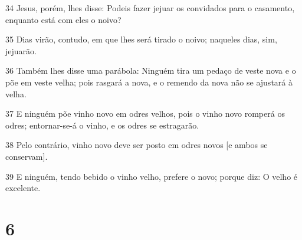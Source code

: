 \par 34 Jesus, porém, lhes disse: Podeis fazer jejuar os convidados para o casamento, enquanto está com eles o noivo?
\par 35 Dias virão, contudo, em que lhes será tirado o noivo; naqueles dias, sim, jejuarão.
\par 36 Também lhes disse uma parábola: Ninguém tira um pedaço de veste nova e o põe em veste velha; pois rasgará a nova, e o remendo da nova não se ajustará à velha.
\par 37 E ninguém põe vinho novo em odres velhos, pois o vinho novo romperá os odres; entornar-se-á o vinho, e os odres se estragarão.
\par 38 Pelo contrário, vinho novo deve ser posto em odres novos [e ambos se conservam].
\par 39 E ninguém, tendo bebido o vinho velho, prefere o novo; porque diz: O velho é excelente.

\chapter{6}

